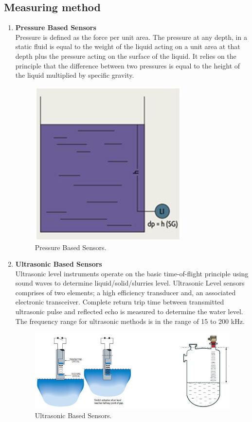 \documentclass[a4paper,12pt]{report}
\begin{document}
\subsection{Measuring method}
\begin{enumerate}
 \item \textbf{Pressure Based Sensors}\\
 Pressure is defined as the force per unit area. The pressure at any depth, in a static fluid is equal to the weight of the liquid acting on a unit area 
 at that depth plus the pressure acting on the surface of the liquid.
 It relies on the principle that the difference between two pressures is equal to the height of the liquid multiplied by specific gravity.\cite{engi}
  \begin{figure}[h]
 \centering
  \includegraphics[width=.20\textwidth]{figures/wl_p.jpg}
  \caption{Pressure Based Sensors.}
  \label{Pressure Based Sensors}
 \end{figure} 
 \item \textbf{Ultrasonic Based Sensors}\\
 Ultrasonic level instruments operate on the basic time-of-flight principle using sound waves to determine liquid/solid/slurries level.
Ultrasonic Level sensors comprises of two elements; a high efficiency transducer and, an associated electronic transceiver. 
Complete return trip time between transmitted  ultrasonic pulse and reflected echo is measured to determine the water level.
 The frequency range for ultrasonic methods is in the range of 15 to 200 kHz.\cite{engi}
  \begin{figure}[h]
 \centering
  \includegraphics[width=.80\textwidth]{figures/wl_u.jpg}
  \caption{Ultrasonic Based Sensors.}
  \label{Ultrasonic Based Sensors}
 \end{figure} 
\end{enumerate}
\end{document}
